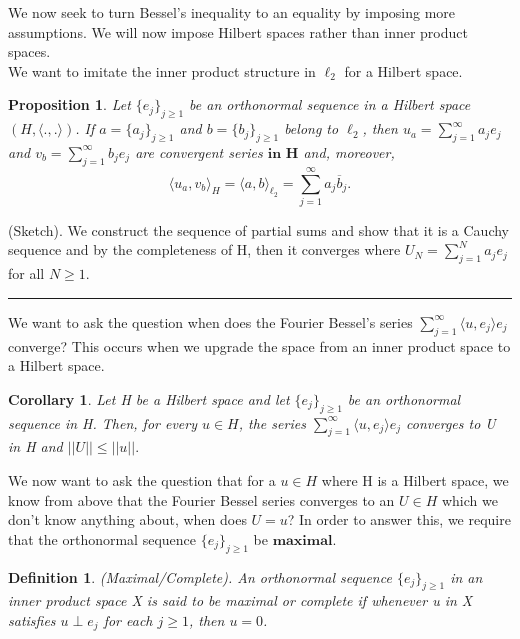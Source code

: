 \documentclass[twoside]{article}
\newtheorem{proposition}[theorem]{Proposition}
\newtheorem{corollary}[theorem]{Corollary}
\newtheorem{definition}[theorem]{Definition}
\newenvironment{proof}{{\bf Proof:}}{\hfill\rule{2mm}{2mm}}
\begin{document}
We now seek to turn Bessel's inequality to an equality by imposing more assumptions. We will now impose Hilbert spaces rather than inner product spaces.\\

We want to imitate the inner product structure in $\ell_2$ for a Hilbert space.

\begin{proposition}Let $\{e_j\}_{j \geq 1}$ be an orthonormal sequence in a Hilbert space $(H, \langle .,. \rangle)$. If $a = \{a_j\}_{j \geq 1}$ and $b = \{b_j\}_{j \geq 1}$ belong to $\ell_2$, then $u_a = \sum_{j=1}^{\infty}a_je_j$ and $v_b = \sum_{j=1}^{\infty}b_je_j$ are convergent series $\textbf{in H}$ and, moreover, 
$$
\langle u_a, v_b \rangle_H = \langle a,b \rangle_{\ell_{2}} = \sum_{j=1}^{\infty}a_j \overline{b}_j.
$$
\end{proposition}

\begin{proof}(Sketch). We construct the sequence of partial sums and show that it is a Cauchy sequence and by the completeness of H, then it converges where $U_N = \sum_{j=1}^Na_je_j$ for all $N \geq 1$.
\end{proof}

We want to ask the question when does the Fourier Bessel's series $\sum_{j=1}^{\infty}\langle u, e_j \rangle e_j$ converge? This occurs when we upgrade the space from an inner product space to a Hilbert space.

\begin{corollary}Let H be a Hilbert space and let $\{e_j\}_{j \geq 1}$ be an orthonormal sequence in H. Then, for every $u \in H$, the series $\sum_{j=1}^{\infty}\langle u, e_j \rangle e_j$ converges to U in H and $||U|| \leq ||u||.$
\end{corollary}

We now want to ask the question that for a $u \in H$ where H is a Hilbert space, we know from above that the Fourier Bessel series converges to an $U \in H$ which we don't know anything about, when does $U = u$? In order to answer this, we require that the orthonormal sequence $\{e_j\}_{j \geq 1}$ be $\textbf{maximal}$.

\begin{definition}(Maximal/Complete). An orthonormal sequence $\{e_j\}_{j \geq 1}$ in an inner product space X is said to be maximal or complete if whenever u in X satisfies $u \perp e_j$ for each $j \geq 1$, then $u = 0$.
\end{definition}
\end{document}
